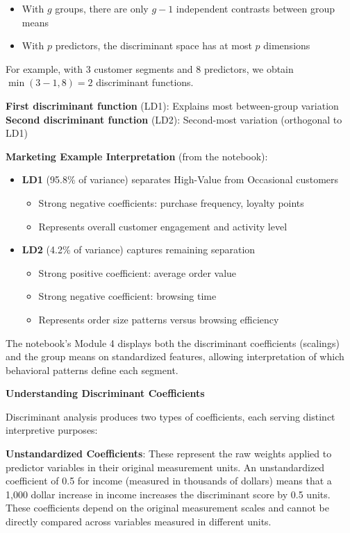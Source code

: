\documentclass[
]{article}
\begin{document}
\begin{itemize}
\item
  With \(g\) groups, there are only \(g - 1\) independent contrasts
  between group means
\item
  With \(p\) predictors, the discriminant space has at most \(p\)
  dimensions
\end{itemize}

For example, with 3 customer segments and 8 predictors, we obtain
\(\min(3 - 1,8) = 2\) discriminant functions.

\textbf{First discriminant function} (LD1): Explains most between-group
variation \textbf{Second discriminant function} (LD2): Second-most
variation (orthogonal to LD1)

\textbf{Marketing Example Interpretation} (from the notebook):

\begin{itemize}
\item
  \textbf{LD1} (95.8\% of variance) separates High-Value from Occasional
  customers

  \begin{itemize}
  \item
    Strong negative coefficients: purchase frequency, loyalty points
  \item
    Represents overall customer engagement and activity level
  \end{itemize}
\item
  \textbf{LD2} (4.2\% of variance) captures remaining separation

  \begin{itemize}
  \item
    Strong positive coefficient: average order value
  \item
    Strong negative coefficient: browsing time
  \item
    Represents order size patterns versus browsing efficiency
  \end{itemize}
\end{itemize}

The notebook's Module 4 displays both the discriminant coefficients
(scalings) and the group means on standardized features, allowing
interpretation of which behavioral patterns define each segment.

\textbf{Understanding Discriminant Coefficients}

Discriminant analysis produces two types of coefficients, each serving
distinct interpretive purposes:

\textbf{Unstandardized Coefficients}: These represent the raw weights
applied to predictor variables in their original measurement units. An
unstandardized coefficient of 0.5 for income (measured in thousands of
dollars) means that a 1,000 dollar increase in income increases the
discriminant score by 0.5 units. These coefficients depend on the
original measurement scales and cannot be directly compared across
variables measured in different units.
\end{document}
